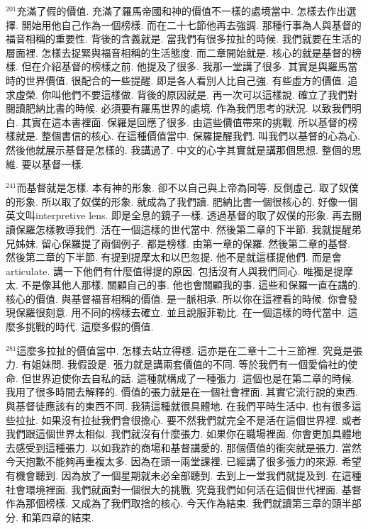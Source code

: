 \documentclass{book}
\begin{document}
$^{201}$充滿了假的價值.
充滿了羅馬帝國和神的價值不一樣的處境當中.
怎樣去作出選擇.
開始用他自己作為一個榜樣.
而在二十七節他再去強調.
那種行事為人與基督的福音相稱的重要性.
背後的含義就是.
當我們有很多拉扯的時候.
我們就要在生活的層面裡.
怎樣去捉緊與福音相稱的生活態度.
而二章開始就是.
核心的就是基督的榜樣.
但在介紹基督的榜樣之前.
他提及了很多.
我那一堂講了很多.
其實是與羅馬當時的世界價值.
很配合的一些提醒.
即是各人看別人比自己強.
有些虛方的價值.
追求虛榮.
你叫他們不要這樣做.
背後的原因就是.
再一次可以這樣說.
確立了我們對閱讀肥納比書的時候.
必須要有羅馬世界的處境.
作為我們思考的狀況.
以致我們明白.
其實在這本書裡面.
保羅是回應了很多.
由這些價值帶來的挑戰.
所以基督的榜樣就是.
整個書信的核心.
在這種價值當中.
保羅提醒我們.
叫我們以基督的心為心.
然後他就展示基督是怎樣的.
我講過了.
中文的心字其實就是講那個思想.
整個的思維.
要以基督一樣.

$^{241}$而基督就是怎樣.
本有神的形象.
卻不以自己與上帝為同等.
反倒虛己.
取了奴僕的形象.
所以取了奴僕的形象.
就成為了我們讀.
肥納比書一個很核心的.
好像一個英文叫interpretive lens.
即是全息的鏡子一樣.
透過基督的取了奴僕的形象.
再去閱讀保羅怎樣教導我們.
活在一個這樣的世代當中.
然後第二章的下半節.
我就提醒弟兄姊妹.
留心保羅提了兩個例子.
都是榜樣.
由第一章的保羅.
然後第二章的基督.
然後第二章的下半節.
有提到提摩太和以巴忽提.
他不是就這樣提他們.
而是會articulate.
講一下他們有什麼值得提的原因.
包括沒有人與我們同心.
唯獨是提摩太.
不是像其他人那樣.
關顧自己的事.
他也會關顧我的事.
這些和保羅一直在講的.
核心的價值.
與基督福音相稱的價值.
是一脈相承.
所以你在這裡看的時候.
你會發現保羅很刻意.
用不同的榜樣去確立.
並且說服菲勒比.
在一個這樣的時代當中.
這麼多挑戰的時代.
這麼多假的價值.

$^{281}$這麼多拉扯的價值當中.
怎樣去站立得穩.
這亦是在二章十二十三節裡.
究竟是張力.
有姐妹問.
我假設是.
張力就是講兩套價值的不同.
等於我們有一個愛倫社的使命.
但世界迫使你去自私的話.
這種就構成了一種張力.
這個也是在第二章的時候.
我用了很多時間去解釋的.
價值的張力就是在一個社會裡面.
其實它流行說的東西.
與基督徒應該有的東西不同.
我猜這種就很具體地.
在我們平時生活中.
也有很多這些拉扯.
如果沒有拉扯我們會很擔心.
要不然我們就完全不是活在這個世界裡.
或者我們跟這個世界太相似.
我們就沒有什麼張力.
如果你在職場裡面.
你會更加具體地去感受到這種張力.
以如我詐的商場和基督講愛的.
那個價值的衝突就是張力.
當然今天抱歉不能夠再重複太多.
因為在頭一兩堂課裡.
已經講了很多張力的來源.
希望有機會聽到.
因為放了一個星期就未必全部聽到.
去到上一堂我們就提及到.
在這種社會環境裡面.
我們就面對一個很大的挑戰.
究竟我們如何活在這個世代裡面.
基督作為那個榜樣.
又成為了我們取捨的核心.
今天作為結束.
我們就讀第三章的頭半部分.
和第四章的結束.
\end{document}
